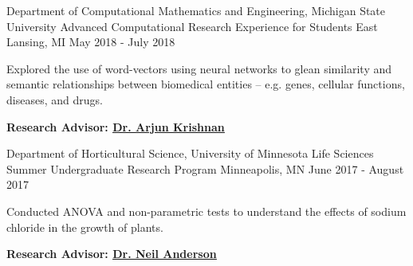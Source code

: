 \begin{cventries}
\cventry
{Department of Computational Mathematics and Engineering, Michigan State University} %
{Advanced Computational Research Experience for Students} %
{East Lansing, MI} %
{May 2018 - July 2018} %
{
\begin{cvitems} %
\item Explored the use of word-vectors using neural networks to glean similarity and semantic relationships \newline between biomedical entities – e.g. genes, cellular functions, diseases, and drugs.
\item \textbf{Research Advisor:  \href{https://www.thekrishnanlab.org}{\underline{Dr. Arjun Krishnan}} 
}
  \end{cvitems}
}

\cventry
{Department of Horticultural Science, University of Minnesota} %
{Life Sciences Summer Undergraduate Research Program} %
{Minneapolis, MN} %
{June 2017 - August 2017} %
{
\begin{cvitems} %
\item Conducted ANOVA and non-parametric tests to understand the effects of sodium chloride in the growth of plants. 
\item \textbf{Research Advisor: \href{https://horticulture.umn.edu/people/neil-anderson}{\underline{Dr. Neil Anderson}} 
}
  \end{cvitems}
}

\end{cventries}

